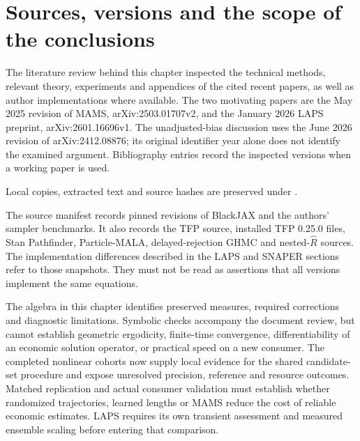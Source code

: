 \section{Sources, versions and the scope of the conclusions}
\label{sec:bf-modern-sources}

The literature review behind this chapter inspected the technical methods,
relevant theory, experiments and appendices of the cited recent papers, as
well as author implementations where available. The two motivating papers
are the May 2025 revision of MAMS, arXiv:2503.01707v2, and the January 2026
LAPS preprint, arXiv:2601.16696v1. The unadjusted-bias discussion uses the
June 2026 revision of arXiv:2412.08876; its original identifier year alone
does not identify the examined argument. Bibliography entries record the
inspected versions when a working paper is used.

Local copies, extracted text and source hashes are preserved under
.

The source manifest records pinned revisions of BlackJAX and the authors'
sampler benchmarks. It also records the TFP source, installed TFP 0.25.0
files, Stan Pathfinder, Particle-MALA, delayed-rejection GHMC and
nested-$\widehat R$ sources.
The implementation differences described in the LAPS and SNAPER sections
refer to those snapshots. They must not be read as assertions that all
versions implement the same equations.

The algebra in this chapter identifies preserved measures, required
corrections and diagnostic limitations. Symbolic checks accompany the
document review, but cannot establish geometric ergodicity, finite-time
convergence, differentiability of an economic solution operator, or practical
speed on a new consumer. The completed nonlinear cohorts now supply local
evidence for the shared candidate-set procedure and expose unresolved
precision, reference and resource outcomes. Matched replication and actual
consumer validation must establish whether randomized trajectories, learned
lengths or MAMS reduce the cost of reliable economic estimates. LAPS requires
its own transient assessment and measured ensemble scaling before entering
that comparison.
